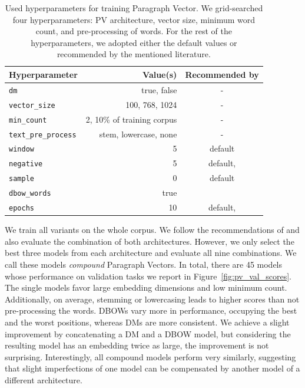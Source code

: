 \begin{table}
  \footnotesize
  \centering
  \begin{tabular}{lrc}
    \toprule
    Hyperparameter & Value(s) & Recommended by \\
    \midrule
    \texttt{dm} & true, false & - \\
    \texttt{vector\_size} & 100, 768, 1024 & - \\
    \texttt{min\_count} & 2, 10\% of training corpus& - \\
    \texttt{text\_pre\_process} & stem, lowercase, none & - \\
    \texttt{window} & 5 & default \\
    \texttt{negative} & 5 & default, \cite{lau2016empirical} \\
    \texttt{sample} & 0 & default \\
    \texttt{dbow\_words} & true & \cite{lau2016empirical} \\
    \texttt{epochs} & 10 & default, \cite{dai2015document} \\
    \bottomrule
  \end{tabular}

  \caption{Used hyperparameters for training Paragraph Vector. We grid-searched
  four hyperparameters: PV architecture, vector size, minimum word count, and
  pre-processing of words. For the rest of the hyperparameters, we adopted either the
  default values or recommended by the mentioned literature.}

  \label{table:pv_hyperparams}

\end{table}

We train all variants on the whole  corpus. We follow the
recommendations of \cite{le2014distributed} and also evaluate the combination of
both architectures. However, we only select the best three models
from each architecture and evaluate all nine combinations. We call these models
\emph{compound} Paragraph Vectors. In total, there are 45 models whose
performance on validation tasks we report in Figure~\ref{fig:pv_val_scores}.
The single models favor large embedding dimensions and low minimum count. Additionally, on average, stemming or lowercasing leads to higher scores
than not pre-processing the words. DBOWs vary more in performance,
occupying the best and the worst positions, whereas DMs are more
consistent. We achieve a slight improvement by concatenating a DM and a DBOW
model, but considering the resulting model has an embedding twice as large, the improvement is not surprising. Interestingly, all compound models
perform very similarly, suggesting that slight imperfections of one model can
be compensated by another model of a different architecture.


